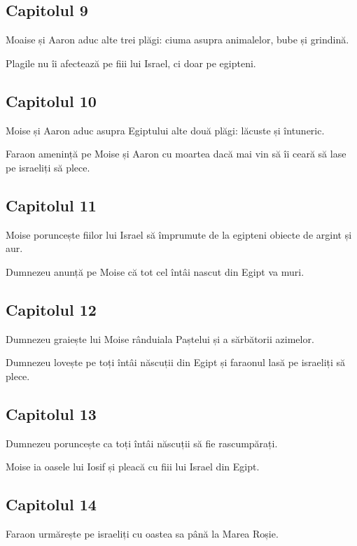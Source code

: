 \documentclass[12pt,a4paper]{article}
\begin{document}
\subsection{Capitolul 9}

Moaise și Aaron aduc alte trei plăgi: ciuma asupra animalelor, bube și grindină.

Plagile nu îi afectează pe fiii lui Israel, ci doar pe egipteni.

\subsection{Capitolul 10}

Moise și Aaron aduc asupra Egiptului alte două plăgi: lăcuste și întuneric.

Faraon amenință pe Moise și Aaron cu moartea dacă mai vin să îi ceară să lase pe israeliți să plece.

\subsection{Capitolul 11}

Moise poruncește fiilor lui Israel să împrumute de la egipteni obiecte de argint și aur.

Dumnezeu anunță pe Moise că tot cel întâi nascut din Egipt va muri.

\subsection{Capitolul 12}

Dumnezeu graiește lui Moise rânduiala Paștelui și a sărbătorii azimelor.

Dumnezeu lovește pe toți întâi născuții din Egipt și faraonul lasă pe israeliți să plece.

\subsection{Capitolul 13}

Dumnezeu poruncește ca toți întâi născuții să fie rascumpărați.

Moise ia oasele lui Iosif și pleacă cu fiii lui Israel din Egipt.

\subsection{Capitolul 14}

Faraon urmărește pe israeliți cu oastea sa până la Marea Roșie.
\end{document}
